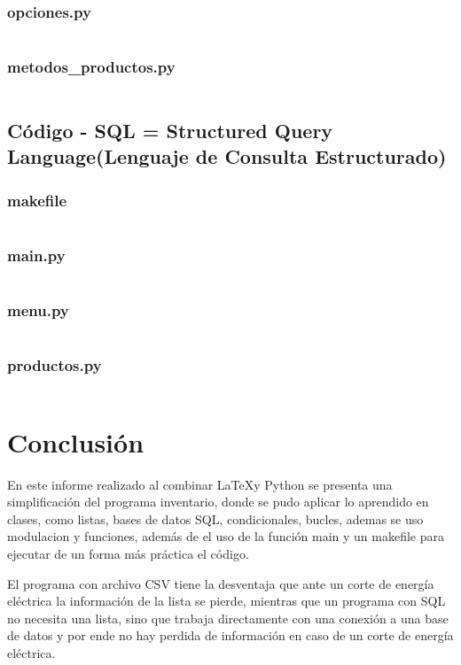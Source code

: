 \documentclass[12pt]{article}
\begin{document}
\subsubsection{opciones.py}
\inputminted[fontsize=\small, breaklines=true]{python}{CodigoCSV/opciones.py}

\subsubsection{metodos\_productos.py}
\inputminted[fontsize=\small, breaklines=true]{python}{CodigoCSV/metodos_productos.py}
\subsection{Código - SQL = Structured Query Language(Lenguaje de Consulta Estructurado)}

\subsubsection{makefile}
\inputminted[fontsize=\small]{make}{CodigoSQL/makefile}

\subsubsection{main.py}
\inputminted[fontsize=\small, breaklines=true]{python}{CodigoSQL/main.py}

\subsubsection{menu.py}
\inputminted[fontsize=\small, breaklines=true]{python}{CodigoSQL/menu.py}

\subsubsection{productos.py}
\inputminted[fontsize=\small, breaklines=true]{python}{CodigoSQL/productos.py}
\section{Conclusión}

En este informe realizado al combinar \LaTeX y Python se presenta una simplificación del programa inventario, donde se pudo aplicar lo aprendido en clases, como listas, bases de datos SQL, condicionales, bucles, ademas se uso modulacion y funciones, además de el uso de la función main y un makefile para ejecutar de un forma más práctica el código.

El programa con archivo CSV tiene la desventaja que ante un corte de energía eléctrica la información de la lista se pierde, mientras que un programa con SQL no necesita una lista, sino que trabaja directamente con una conexión a una base de datos y por ende no hay perdida de información en caso de un corte de energía eléctrica.
\end{document}

